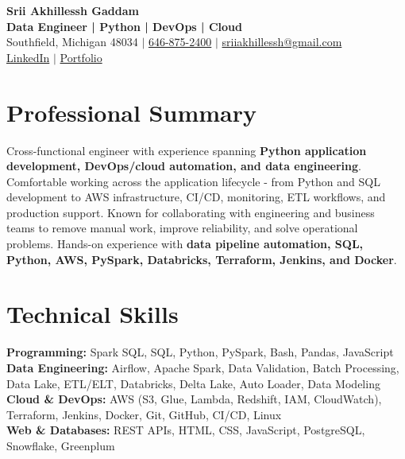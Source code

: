 \documentclass[letterpaper,10pt]{article}
\begin{document}
\fontsize{9.35pt}{10.45pt}\selectfont

\begin{center}
    {\LARGE \textbf{Srii Akhillessh Gaddam}} \\[-1pt]
    \textbf{Data Engineer | Python | DevOps | Cloud} \\[2pt]
    Southfield, Michigan 48034 $|$
    \href{tel:6468752400}{646-875-2400} $|$
    \href{mailto:sriiakhillessh@gmail.com}{sriiakhillessh@gmail.com} \\[1pt]
    \href{https://www.linkedin.com/in/srii-akhiilessh-gaddam-b48668191/}{LinkedIn} $|$
    \href{https://sriiakhillesshg.github.io/portfolio/}{Portfolio}
\end{center}
\vspace{-8pt}

\section{Professional Summary}
\small{Cross-functional engineer with experience spanning \textbf{Python application development, DevOps/cloud automation, and data engineering}. Comfortable working across the application lifecycle - from Python and SQL development to AWS infrastructure, CI/CD, monitoring, ETL workflows, and production support. Known for collaborating with engineering and business teams to remove manual work, improve reliability, and solve operational problems. Hands-on experience with \textbf{data pipeline automation, SQL, Python, AWS, PySpark, Databricks, Terraform, Jenkins, and Docker}.}

\section{Technical Skills}
\small{
\textbf{Programming:} Spark SQL, SQL, Python, PySpark, Bash, Pandas, JavaScript \\
\textbf{Data Engineering:} Airflow, Apache Spark, Data Validation, Batch Processing, Data Lake, ETL/ELT, Databricks, Delta Lake, Auto Loader, Data Modeling \\
\textbf{Cloud \& DevOps:} AWS (S3, Glue, Lambda, Redshift, IAM, CloudWatch), Terraform, Jenkins, Docker, Git, GitHub, CI/CD, Linux \\
\textbf{Web \& Databases:} REST APIs, HTML, CSS, JavaScript, PostgreSQL, Snowflake, Greenplum
}
\end{document}

